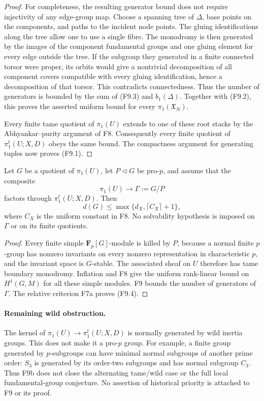 \begin{proof}
For completeness, the resulting generator bound does not require
injectivity of any edge-group map. Choose a spanning tree of
$\Delta$, base points on the components, and paths to the incident
node points. The gluing identifications along the tree allow one
to use a single fibre. The monodromy is then generated by the
images of the component fundamental groups and one gluing
element for every edge outside the tree. If the subgroup they
generated in a finite connected torsor were proper, its orbits
would give a nontrivial decomposition of all component covers
compatible with every gluing identification, hence a decomposition
of that torsor. This contradicts connectedness. Thus the number
of generators is bounded by the sum of (F9.3) and $b_1(\Delta)$.
Together with (F9.2), this proves the asserted uniform bound for
every $\pi_1(\mathfrak X_N)$.

Every finite tame quotient of $\pi_1(U)$ extends to one of these
root stacks by the Abhyankar--purity argument of F8. Consequently
every finite quotient of $\pi_1^t(U;X,D)$ obeys the same bound.
The compactness argument for generating tuples now proves (F9.1).
\end{proof}

\begin{corollary}
Let $G$ be a quotient of $\pi_1(U)$, let $P\triangleleft G$ be
pro-$p$, and assume that the composite
\[
 \pi_1(U)\longrightarrow\Gamma:=G/P
\]
factors through $\pi_1^t(U;X,D)$. Then
\[
 d(G)\leq\max\{d_X,\lceil C_X\rceil+1\},
 \tag{F9.4}
\]
where $C_X$ is the uniform constant in F8. No solvability
hypothesis is imposed on $\Gamma$ or on its finite quotients.
\end{corollary}
\begin{proof}
Every finite simple $\mathbf F_p[G]$-module is killed by $P$,
because a normal finite $p$-group has nonzero invariants on every
nonzero representation in characteristic $p$, and the invariant
space is $G$-stable. The associated sheaf on $U$ therefore has
tame boundary monodromy. Inflation and F8 give the uniform
rank-linear bound on $H^1(G,M)$ for all these simple modules.
F9 bounds the number of generators of $\Gamma$. The relative
criterion F7a proves (F9.4).
\end{proof}

\paragraph{Remaining wild obstruction.}
The kernel of $\pi_1(U)\to\pi_1^t(U;X,D)$ is normally generated
by wild inertia groups. This does not make it a pro-$p$ group.
For example, a finite group generated by $p$-subgroups can have
minimal normal subgroups of another prime order: $S_3$ is generated
by its order-two subgroups and has normal subgroup $C_3$.
Thus F9b does not close the alternating tame/wild case or the full
local fundamental-group conjecture. No assertion of historical
priority is attached to F9 or its proof.

